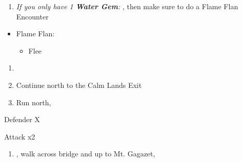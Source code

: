 \begin{enumerate}[resume]
	\item \textit{If you only have 1 \textbf{Water Gem}:} \formation{\tidus}{\auron}{\yuna}, then make sure to do a Flame Flan Encounter
\end{enumerate}
\begin{encounters}
	\begin{itemize}
		\item Flame Flan:
		      \begin{itemize}
			      \kimahrif Steal
			      \item Flee
		      \end{itemize}
	\end{itemize}
\end{encounters}
\begin{enumerate}[resume]
	\item \formation{\tidus}{\kimahri}{\auron}
	\item Continue north to the Calm Lands Exit
	\item Run north, \sd
\end{enumerate}
\begin{battle}[64000]{Defender X}
	\begin{itemize}
		\switch{\tidus}{\yuna}
		\summon{\bahamut}
		\bahamutf Attack x2
	\end{itemize}
\end{battle}
\begin{enumerate}[resume]
	\item \sd, walk across bridge and up to Mt. Gagazet, \sd
\end{enumerate}
